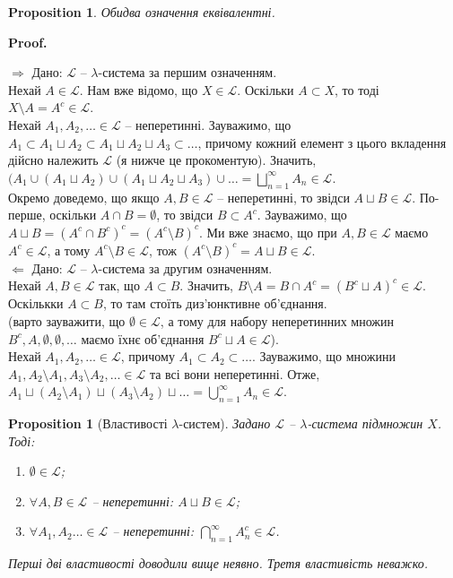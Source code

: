 \documentclass[a4paper, 10pt]{article}
\makeatletter
\def\rightproof{$\boxed{\Rightarrow}$ }
\def\leftproof{$\boxed{\Leftarrow}$ }
\theoremstyle{theoremdd}
\newtheorem{proposition}[theorem]{Proposition}
\renewenvironment{proof}[1][Proof.\\]{\par
\pushQED{\hfill \qed}%
\normalfont \topsep6\p@\@plus6\p@\relax
\trivlist
\item\relax
{\bfseries
#1\@addpunct{.}}\hspace\labelsep\ignorespaces
}{%
\popQED\endtrivlist\@endpefalse
}
\makeatother
\begin{document}
\begin{proposition}
Обидва означення еквівалентні.
\end{proposition}

\begin{proof}
\rightproof Дано: $\mathcal{L}$ -- $\lambda$-система за першим означенням.\\
Нехай $A \in \mathcal{L}$. Нам вже відомо, що $X \in \mathcal{L}$. Оскільки $A \subset X$, то тоді $X \setminus A = A^c \in \mathcal{L}$.\\
Нехай $A_1,A_2,\dots \in \mathcal{L}$ -- неперетинні. Зауважимо, що $A_1 \subset A_1 \sqcup A_2 \subset A_1 \sqcup A_2 \sqcup A_3 \subset \dots$, причому кожний елемент з цього вкладення дійсно належить $\mathcal{L}$ (я нижче це прокоментую). Значить, $(A_1 \cup (A_1 \sqcup A_2) \cup (A_1 \sqcup A_2 \sqcup A_3) \cup \dots = \displaystyle\bigsqcup_{n=1}^\infty A_n \in \mathcal{L}$.
\bigskip \\
Окремо доведемо, що якщо $A,B \in \mathcal{L}$ -- неперетинні, то звідси $A \sqcup B \in \mathcal{L}$. По-перше, оскільки $A \cap B = \emptyset$, то звідси $B \subset A^c$. Зауважимо, що $A \sqcup B = (A^c \cap B^c)^c = (A^c \setminus B)^c$. Ми вже знаємо, що при $A,B \in \mathcal{L}$ маємо $A^c \in \mathcal{L}$, а тому $A^c \setminus B \in \mathcal{L}$, тож $(A^c \setminus B)^c = A \sqcup B \in \mathcal{L}$.
\bigskip \\
\leftproof Дано: $\mathcal{L}$ -- $\lambda$-система за другим означенням.\\
Нехай $A,B \in \mathcal{L}$ так, що $A \subset B$. Значить, $B \setminus A = B \cap A^c = (B^c \sqcup A)^c \in \mathcal{L}$. Оскількки $A \subset B$, то там стоїть диз'юнктивне об'єднання.\\ (варто зауважити, що $\emptyset \in \mathcal{L}$, а тому для набору неперетинних множин $B^c, A, \emptyset, \emptyset, \dots$ маємо їхнє об'єднання $B^c \sqcup A \in \mathcal{L}$).\\
Нехай $A_1,A_2,\dots \in \mathcal{L}$, причому $A_1 \subset A_2 \subset \dots$. Зауважимо, що множини $A_1, A_2 \setminus A_1, A_3 \setminus A_2, \dots \in \mathcal{L}$ та всі вони неперетинні. Отже, $A_1 \sqcup (A_2 \setminus A_1) \sqcup (A_3 \setminus A_2) \sqcup \dots = \displaystyle\bigcup_{n=1}^\infty A_n \in \mathcal{L}$.
\end{proof}

\begin{proposition}[Властивості $\lambda$-систем]
Задано $\mathcal{L}$ -- $\lambda$-система підмножин $X$. Тоді:
\begin{enumerate}[nosep,wide=0pt,label={\arabic*)}]
\item $\emptyset \in \mathcal{L}$;
\item $\forall A,B \in \mathcal{L}$ -- неперетинні: $A \sqcup B \in \mathcal{L}$;
\item $\forall A_1,A_2\dots \in \mathcal{L}$ -- неперетинні: $\displaystyle\bigcap_{n=1}^\infty A_n^c \in \mathcal{L}$.
\end{enumerate}
\textit{Перші дві властивості доводили вище неявно. Третя властивість неважко.}
\end{proposition}
\end{document}
